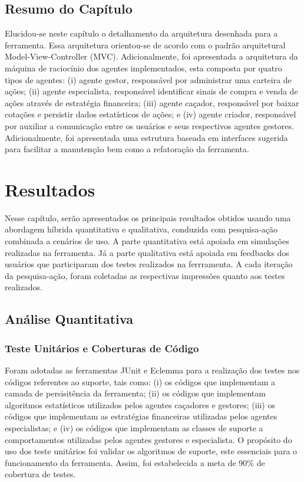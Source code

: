 \section{Resumo do Capítulo}

Elucidou-se neste capítulo o detalhamento da arquitetura desenhada para a ferramenta. Essa arquitetura orientou-se de acordo com o padrão arquitetural Model-View-Controller (MVC). Adicionalmente, foi apresentada a arquitetura da máquina de raciocínio dos agentes implementados, esta composta por quatro tipos de agentes: (i) agente gestor, responsável por administrar uma carteira de ações; (ii) agente especialista, responsável identificar sinais de compra e venda de ações através de estratégia financeira; (iii) agente caçador,  responsável por baixar cotações e persistir dados estatísticos de ações; e (iv) agente criador, responsável por auxiliar a comunicação entre os usuários e seus respectivos agentes gestores.
Adicionalmente, foi apresentada uma estrutura baseada em interfaces sugerida para facilitar a manutenção bem como a refatoração da ferramenta.  


\newpage
\chapter[RESULTADOS]{Resultados}

Nesse capítulo, serão apresentados os principais resultados obtidos usando uma abordagem híbrida quantitativa e qualitativa, conduzida com pesquisa-ação combinada a cenários de uso. A parte quantitativa está apoiada em simulações realizadas na ferramenta. Já a parte qualitativa está apoiada em feedbacks dos usuários que participaram dos testes realizados na ferrramenta. A cada iteração da pesquisa-ação, foram coletadas as respectivas impressões quanto aos testes realizados.

\section{Análise Quantitativa}
\subsection{Teste Unitários e Coberturas de Código}

Foram adotadas as ferramentas JUnit e Eclemma para a realização dos testes nos códigos referentes ao suporte, tais como: (i) os códigos que implementam a camada de persisitência da ferramenta; (ii) os códigos que implementam algoritmos estatísticos utilizados pelos agentes caçadores e gestores; (iii) os códigos que implementam as estratégias financeiras utilizadas pelos agentes especialistas; e (iv) os códigos que implementam as classes de suporte a comportamentos utilizadas pelos agentes gestores e especialista. O propósito do uso dos teste unitários foi validar os algoritmos de suporte, este essenciais para o funcionamento da ferramenta. Assim, foi estabelecida a meta de 90\% de cobertura de testes.

